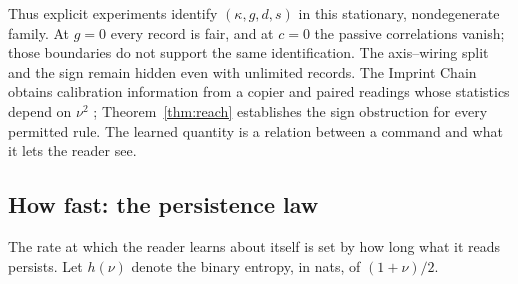 \documentclass[11pt,a4paper]{article}
\begin{document}
Thus explicit experiments identify $(\kappa,g,d,s)$ in this stationary, nondegenerate family. At $g=0$ every record is fair, and at $c=0$ the passive correlations vanish; those boundaries do not support the same identification. The axis--wiring split and the sign remain hidden even with unlimited records. The Imprint Chain obtains calibration information from a copier and paired readings whose statistics depend on $\nu^2$ \cite{ImprintChain}; Theorem~\ref{thm:reach} establishes the sign obstruction for every permitted rule. The learned quantity is a relation between a command and what it lets the reader see.

\subsection{How fast: the persistence law}\label{subsec:rate}

The rate at which the reader learns about itself is set by how long what it reads persists. Let $h(\nu)$ denote the binary entropy, in nats, of $(1+\nu)/2$.
\end{document}
